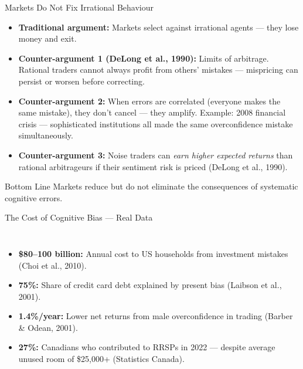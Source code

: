 \documentclass[aspectratio=169]{beamer}
\begin{document}
\begin{frame}{Markets Do Not Fix Irrational Behaviour}
\begin{itemize}[<+->]
  \item \textbf{Traditional argument:} Markets select against irrational agents --- they lose money and exit.
  \item \textbf{Counter-argument 1 (DeLong et al., 1990):} Limits of arbitrage. Rational traders cannot always profit from others' mistakes --- mispricing can persist or worsen before correcting.
  \item \textbf{Counter-argument 2:} When errors are \alert{correlated} (everyone makes the same mistake), they don't cancel --- they amplify. Example: 2008 financial crisis --- sophisticated institutions all made the same overconfidence mistake simultaneously.
  \item \textbf{Counter-argument 3:} Noise traders can \textit{earn higher expected returns} than rational arbitrageurs if their sentiment risk is priced (DeLong et al., 1990).
\end{itemize}
\pause
\begin{alertblock}{Bottom Line}
Markets reduce but do not eliminate the consequences of systematic cognitive errors.
\end{alertblock}
\end{frame}

\begin{frame}{The Cost of Cognitive Bias --- Real Data}
\begin{columns}
\begin{itemize}
  \item \textbf{\$80--100 billion:} Annual cost to US households from investment mistakes (Choi et al., 2010).
  \item \textbf{75\%:} Share of credit card debt explained by present bias (Laibson et al., 2001).
  \item \textbf{1.4\%/year:} Lower net returns from male overconfidence in trading (Barber \& Odean, 2001).
  \item \textbf{27\%:} Canadians who contributed to RRSPs in 2022 --- despite average unused room of \$25{,}000+ (Statistics Canada).
\end{itemize}
\end{columns}
\end{frame}
\end{document}

